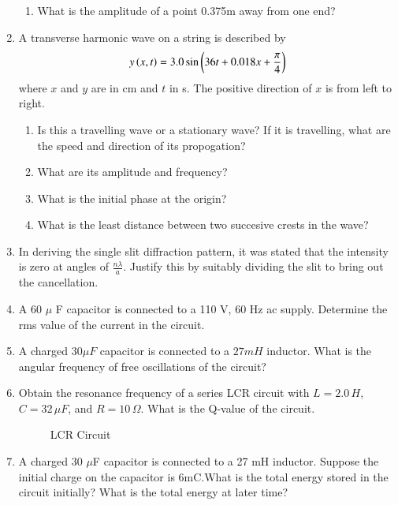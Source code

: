 \begin{enumerate}[label=\thesection.\arabic*,ref=\thesection.\theenumi]
\begin{enumerate}
 \item What is the amplitude of a point 0.375m away from one end? \\
 \end{enumerate}
 \solution
 \pagebreak
 
 \item 
 A transverse harmonic wave on a string is described by
\begin{align}
    y\left(x,t\right)=3.0 \sin\left(36t+0.018x+\frac{\pi}{4}\right)
\end{align}
where $x$ and $y$ are in cm and $t$ in s. The positive direction of $x$ is from left to right.
\begin{enumerate}[label=(\alph*)]
    \item Is this a travelling wave or a stationary wave? If it is travelling, what are the speed and direction of its propogation?
    \item What are its amplitude and frequency?
    \item What is the initial phase at the origin?
    \item  What is the least distance between two succesive crests in the wave?
\end{enumerate}

\solution
\pagebreak

\item In deriving the single slit diffraction pattern, it was stated that the intensity is zero at angles of $\frac{n\lambda}{a}$. Justify this by suitably dividing the slit to bring out the cancellation.\\
\solution
\pagebreak

\item A 60 $\mu$ F capacitor is connected to a 110 V, 60 Hz ac supply. Determine the rms value of the current in the circuit.\\
\solution
\pagebreak

\item A charged  $30\mu F$ capacitor is connected to a $27 mH$ inductor. What is the angular frequency of free oscillations of the circuit?\\
\solution

\pagebreak
\item Obtain the resonance frequency of a series LCR circuit with $L = 2.0\, H$, $C = 32\, \mu F$, and $R = 10\, \Omega$. What is the Q-value of the circuit.

\begin{figure}[!h]
	\centering
	
	\caption{LCR Circuit}
	\label{fig: cirkswa1}
\end{figure}
\solution

\pagebreak
\item A charged 30 $\mu$F capacitor is connected to a 27 mH inductor. Suppose the initial charge on the capacitor is 6mC.What is the total energy stored in the circuit initially? What is the
total energy at later time? \\
\solution

\pagebreak


\end{enumerate}

